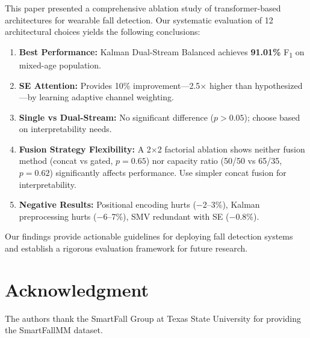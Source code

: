 \documentclass[journal,12pt]{IEEEtran}
\newcommand{\best}[1]{\textbf{\textcolor{bestresult}{#1}}}
\newcommand{\fone}{F\textsubscript{1}}
\begin{document}
This paper presented a comprehensive ablation study of transformer-based architectures for wearable fall detection. Our systematic evaluation of 12 architectural choices yields the following conclusions:

\begin{enumerate}
    \item \textbf{Best Performance:} Kalman Dual-Stream Balanced achieves \best{91.01\%} \fone{} on mixed-age population.

    \item \textbf{SE Attention:} Provides 10\% improvement---2.5$\times$ higher than hypothesized---by learning adaptive channel weighting.

    \item \textbf{Single vs Dual-Stream:} No significant difference ($p > 0.05$); choose based on interpretability needs.

    \item \textbf{Fusion Strategy Flexibility:} A 2$\times$2 factorial ablation shows neither fusion method (concat vs gated, $p=0.65$) nor capacity ratio (50/50 vs 65/35, $p=0.62$) significantly affects performance. Use simpler concat fusion for interpretability.

    \item \textbf{Negative Results:} Positional encoding hurts ($-$2--3\%), Kalman preprocessing hurts ($-$6--7\%), SMV redundant with SE ($-$0.8\%).
\end{enumerate}

Our findings provide actionable guidelines for deploying fall detection systems and establish a rigorous evaluation framework for future research.


\section*{Acknowledgment}

The authors thank the SmartFall Group at Texas State University for providing the SmartFallMM dataset.

\end{document}
